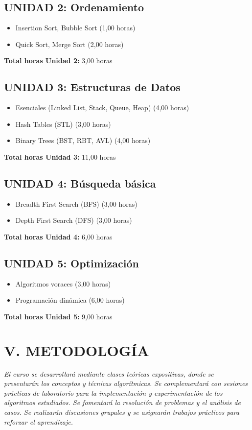 \documentclass[12pt,a4paper]{article}
\begin{document}
\subsection*{UNIDAD 2: Ordenamiento}
\begin{itemize}[leftmargin=*]
    \item Insertion Sort, Bubble Sort (1,00 horas)
    \item Quick Sort, Merge Sort (2,00 horas)
\end{itemize}
\textbf{Total horas Unidad 2:} 3,00 horas

\subsection*{UNIDAD 3: Estructuras de Datos}
\begin{itemize}[leftmargin=*]
    \item Esenciales (Linked List, Stack, Queue, Heap) (4,00 horas)
    \item Hash Tables (STL) (3,00 horas)
    \item Binary Trees (BST, RBT, AVL) (4,00 horas)
\end{itemize}
\textbf{Total horas Unidad 3:} 11,00 horas

\subsection*{UNIDAD 4: Búsqueda básica}
\begin{itemize}[leftmargin=*]
    \item Breadth First Search (BFS) (3,00 horas)
    \item Depth First Search (DFS) (3,00 horas)
\end{itemize}
\textbf{Total horas Unidad 4:} 6,00 horas

\subsection*{UNIDAD 5: Optimización}
\begin{itemize}[leftmargin=*]
    \item Algoritmos voraces (3,00 horas)
    \item Programación dinámica (6,00 horas)
\end{itemize}
\textbf{Total horas Unidad 5:} 9,00 horas
\vspace{0.5cm}

\section*{V. METODOLOGÍA}
\textit{El curso se desarrollará mediante clases teóricas expositivas, donde se presentarán los conceptos y técnicas algorítmicas. Se complementará con sesiones prácticas de laboratorio para la implementación y experimentación de los algoritmos estudiados. Se fomentará la resolución de problemas y el análisis de casos. Se realizarán discusiones grupales y se asignarán trabajos prácticos para reforzar el aprendizaje.}
\vspace{0.5cm}
\end{document}

